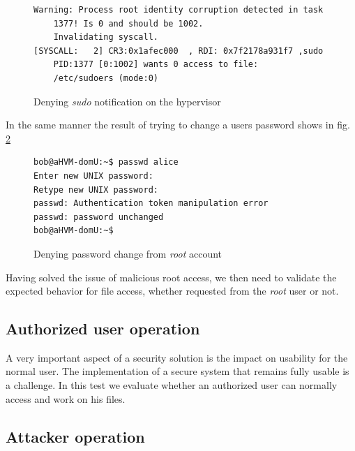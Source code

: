 \begin{figure}[ht]
	\centering
	\footnotesize{\selectfont 
		\begin{lstlisting}
Warning: Process root identity corruption detected in task 
	1377! Is 0 and should be 1002. 
	Invalidating syscall.
[SYSCALL:   2] CR3:0x1afec000  , RDI: 0x7f2178a931f7 ,sudo 
	PID:1377 [0:1002] wants 0 access to file: 
	/etc/sudoers (mode:0)
		\end{lstlisting}}
	\caption{Denying \emph{sudo} notification on the hypervisor}
	\label{fig:sudo_deny_not}
\end{figure}

\par In the same manner the result of trying to change a users password shows in fig. \ref{fig:passwd_deny}

\begin{figure}[ht]
	\centering
	\footnotesize{\selectfont 
		\begin{lstlisting}
bob@aHVM-domU:~$ passwd alice
Enter new UNIX password:
Retype new UNIX password:
passwd: Authentication token manipulation error
passwd: password unchanged
bob@aHVM-domU:~$
		\end{lstlisting}}
	\caption{Denying password change from \emph{root} account}
	\label{fig:passwd_deny}
\end{figure}


\par Having solved the issue of malicious root access, we then need to validate the expected behavior for file access, whether requested from the \emph{root} user or not.

\subsection{Authorized user operation}

\par A very important aspect of a security solution is the impact on usability for the normal user. The implementation of a secure system that remains fully usable is a challenge. In this test we evaluate whether an authorized user can normally access and work on his files. 

\subsection{Attacker operation}




